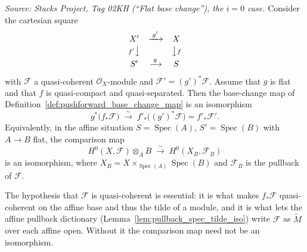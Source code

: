 \begin{theorem}[Flat base change, $i=0$ case]
  \label{thm:flat_base_change_pushforward}
  \textit{Source: Stacks Project, Tag 02KH (``Flat base change''), the
  \(i = 0\) case.}
  Consider the cartesian square
  \[
    \begin{array}{ccc}
      X' & \xrightarrow{\;g'\;} & X \\[2pt]
      {\scriptstyle f'}\big\downarrow & & \big\downarrow{\scriptstyle f} \\[2pt]
      S' & \xrightarrow{\;g\;} & S
    \end{array}
  \]
  with \(\mathcal{F}\) a quasi-coherent \(\mathcal{O}_X\)-module and
  \(\mathcal{F}' = (g')^*\mathcal{F}\). Assume that \(g\) is flat and that \(f\)
  is quasi-compact and quasi-separated. Then the base-change map of
  Definition~\ref{def:pushforward_base_change_map} is an isomorphism
  \[
    g^*\bigl(f_*\mathcal{F}\bigr) \;\xrightarrow{\;\sim\;}\;
    f'_*\bigl((g')^*\mathcal{F}\bigr) = f'_*\mathcal{F}' .
  \]
  Equivalently, in the affine situation \(S = \operatorname{Spec}(A)\),
  \(S' = \operatorname{Spec}(B)\) with \(A \to B\) flat, the comparison map
  \[
    H^0(X, \mathcal{F}) \otimes_A B \;\xrightarrow{\;\sim\;}\;
    H^0(X_B, \mathcal{F}_B)
  \]
  is an isomorphism, where \(X_B = X \times_{\operatorname{Spec}(A)}
  \operatorname{Spec}(B)\) and \(\mathcal{F}_B\) is the pullback of
  \(\mathcal{F}\).

  The hypothesis that \(\mathcal{F}\) is quasi-coherent is essential: it is what
  makes \(f_*\mathcal{F}\) quasi-coherent on the affine base and thus the tilde of
  a module, and it is what lets the affine pullback dictionary
  (Lemma~\ref{lem:pullback_spec_tilde_iso}) write \(\mathcal{F}\) as
  \(\widetilde{M}\) over each affine open. Without it the comparison map need not be
  an isomorphism.
\end{theorem}


